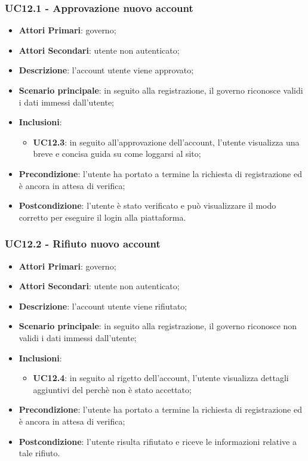 \subsubsection{UC12.1 - Approvazione nuovo account}
\begin{itemize}
	\item \textbf{Attori Primari}:
	governo;
	\item \textbf{Attori Secondari}:
	utente non autenticato;
	\item \textbf{Descrizione}: l'account utente viene approvato;
	\item \textbf{Scenario principale}: in seguito alla registrazione, il governo riconosce validi i dati immessi dall'utente;
	\item \textbf{Inclusioni}:
	\begin{itemize}
		\item \textbf{UC12.3}: in seguito all'approvazione dell'account, l'utente visualizza una breve e concisa guida su come loggarsi al sito;
	\end{itemize}
	\item \textbf{Precondizione}: l'utente ha portato a termine la richiesta di registrazione ed è ancora in attesa di verifica;
	\item \textbf{Postcondizione}: l'utente è stato verificato e può visualizzare il modo corretto per eseguire il login alla piattaforma.
	
\end{itemize}
\subsubsection{UC12.2 - Rifiuto nuovo account}
\begin{itemize}
	\item \textbf{Attori Primari}:
	governo;
	\item \textbf{Attori Secondari}:
	utente non autenticato;
	\item \textbf{Descrizione}: l'account utente viene rifiutato;
	\item \textbf{Scenario principale}: in seguito alla registrazione, il governo riconosce non validi i dati immessi dall'utente;
	\item \textbf{Inclusioni}:
	\begin{itemize}
		\item \textbf{UC12.4}: in seguito al rigetto  dell'account, l'utente visualizza dettagli aggiuntivi del perchè non è stato accettato;
	\end{itemize}
	\item \textbf{Precondizione}: l'utente ha portato a termine la richiesta di registrazione ed è ancora in attesa di verifica;
	\item \textbf{Postcondizione}: l'utente risulta rifiutato e riceve le informazioni relative a tale rifiuto.
	
\end{itemize}
